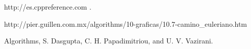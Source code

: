 \documentclass[es]{ifirak}
\begin{document}
\begin{thebibliography}{arauak}
	
	 http://es.cppreference.com .
	
	 http://pier.guillen.com.mx/algorithms/10-graficas/10.7-camino\_euleriano.htm
	
	 Algorithms, S. Dasgupta, C. H. Papadimitriou, and U. V. Vazirani.
	
\end{thebibliography}
\end{document}
